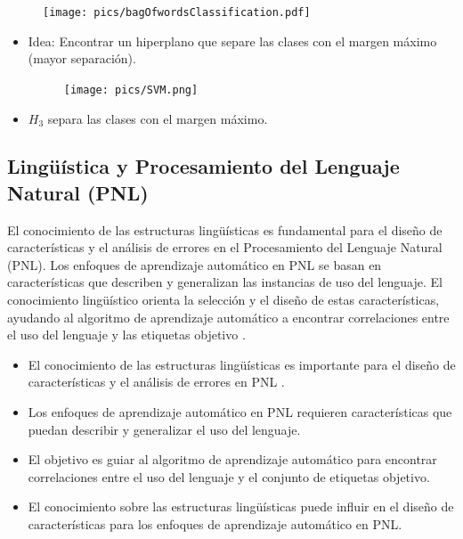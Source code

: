 \documentclass{book}
\begin{document}
\begin{figure}[h]
        	\texttt{[image: pics/bagOfwordsClassification.pdf]}
        \end{figure}


\begin{itemize}


\item Idea: Encontrar un hiperplano que separe las clases con el margen máximo (mayor separación).

     \begin{figure}[h]
        	\texttt{[image: pics/SVM.png]}
        \end{figure}

\item $H_3$ separa las clases con el margen máximo.

\end{itemize}


\subsection{Lingüística y Procesamiento del Lenguaje Natural (PNL)}

El conocimiento de las estructuras lingüísticas es fundamental para el diseño de características y el análisis de errores en el Procesamiento del Lenguaje Natural (PNL). Los enfoques de aprendizaje automático en PNL se basan en características que describen y generalizan las instancias de uso del lenguaje. El conocimiento lingüístico orienta la selección y el diseño de estas características, ayudando al algoritmo de aprendizaje automático a encontrar correlaciones entre el uso del lenguaje y las etiquetas objetivo \cite{bender2013linguistic}.

\begin{itemize}
  \item El conocimiento de las estructuras lingüísticas es importante para el diseño de características y el análisis de errores en PNL \cite{bender2013linguistic}.
  \item Los enfoques de aprendizaje automático en PNL requieren características que puedan describir y generalizar el uso del lenguaje.
  \item El objetivo es guiar al algoritmo de aprendizaje automático para encontrar correlaciones entre el uso del lenguaje y el conjunto de etiquetas objetivo.
  \item El conocimiento sobre las estructuras lingüísticas puede influir en el diseño de características para los enfoques de aprendizaje automático en PNL.
\end{itemize}
\end{document}
